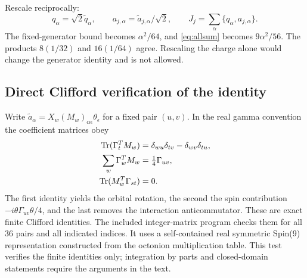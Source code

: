 Rescale reciprocally:
\begin{equation}
 q_\alpha=\sqrt2\widetilde q_\alpha,\qquad
 a_{j,\alpha}=\widetilde a_{j,\alpha}/\sqrt2,\qquad
 J_j=\sum_\alpha\{q_\alpha,a_{j,\alpha}\}.
\end{equation}
The fixed-generator bound becomes $\alpha^2/64$, and \eqref{eq:allsum} becomes $9\alpha^2/56$. The products $8(1/32)$ and $16(1/64)$ agree. Rescaling the charge alone would change the generator identity and is not allowed.

\subsection{Direct Clifford verification of the identity}
Write $\widetilde a_\alpha=X_w(M_w)_{\alpha\epsilon}\theta_\epsilon$ for a fixed pair $(u,v)$. In the real gamma convention the coefficient matrices obey
\begin{align}
 \operatorname{Tr}(\Gamma_t^TM_w)&=\delta_{wu}\delta_{tv}-\delta_{wv}\delta_{tu},\\
 \sum_w\Gamma_w^TM_w&=\tfrac14\Gamma_{uv},\\
 \operatorname{Tr}(M_w^T\Gamma_{st})&=0.
\end{align}
The first identity yields the orbital rotation, the second the spin contribution $-i\theta\Gamma_{uv}\theta/4$, and the last removes the interaction anticommutator. These are exact finite Clifford identities. The included integer-matrix program checks them for all $36$ pairs and all indicated indices. It uses a self-contained real symmetric Spin(9) representation constructed from the octonion multiplication table. This test verifies the finite identities only; integration by parts and closed-domain statements require the arguments in the text.

